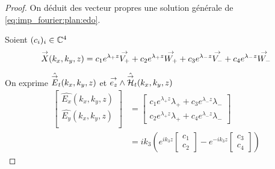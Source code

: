     \begin{proof}
        On déduit des vecteur propres une solution générale de \eqref{eq:imp_fourier:plan:edo}.

        Soient \((c_i)_{i} \in \mathbb C^4\)
        \begin{equation}
            {\overset{\rightarrow}{X}}(k_x,k_y,z) = c_1e^{\lambda_+ z}{\overset{\rightarrow}{V_+}}  + c_2e^{\lambda_+ z}{\overset{\rightarrow}{W_+}} + c_3e^{\lambda_- z}{\overset{\rightarrow}{V_-}} +c_4e^{\lambda_- z}{\overset{\rightarrow}{W_-}}
        \end{equation}

        On exprime \(\hat {{\overset{\rightarrow}{E}}}_t(k_x,k_y,z)\) et \({\overset{\rightarrow}{e_z}} \wedge \hat {{\overset{\rightarrow}{\mathcal{H}}}}_t(k_x,k_y,z)\)
        \begin{align}
            \begin{bmatrix}
                \hat{E_x}(k_x,k_y,z)\\
                \hat{E_y}(k_x,k_y,z)\\
            \end{bmatrix}
            &=
            \begin{bmatrix}
                c_1 e^{\lambda_+ z} \lambda_{+} + c_3 e^{\lambda_- z} \lambda_{-} \\
                c_2 e^{\lambda_+ z} \lambda_{+} + c_4 e^{\lambda_- z} \lambda_{-}
            \end{bmatrix}\\
            &=ik_3\left( e^{ik_3 z}
            \begin{bmatrix}
                c_1 \\
                c_2
            \end{bmatrix}
            -e^{-ik_3 z}
            \begin{bmatrix}
                c_3 \\
                c_4
            \end{bmatrix}
            \right)
        \end{align}


\end{proof}
